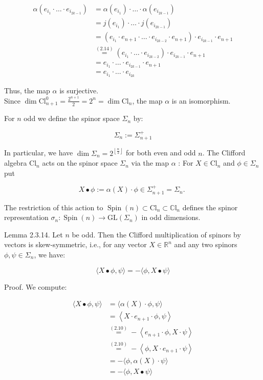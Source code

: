 \documentclass[10pt, letterpaper]{article}
\begin{document}
$$
\begin{aligned}
\alpha\left(e_{i_{1}} \cdot \ldots \cdot e_{i_{2 k-1}}\right) & =\alpha\left(e_{i_{1}}\right) \cdot \ldots \cdot \alpha\left(e_{i_{2 k-1}}\right) \\
& =j\left(e_{i_{1}}\right) \cdot \ldots \cdot j\left(e_{i_{2 k-1}}\right) \\
& =\left(e_{i_{1}} \cdot e_{n+1} \cdot \ldots \cdot e_{i_{2 k-2}} \cdot e_{n+1}\right) \cdot e_{i_{2 k-1}} \cdot e_{n+1} \\
& \stackrel{(2.14)}{=}\left(e_{i_{1}} \cdot \ldots \cdot e_{i_{2 k-2}}\right) \cdot e_{i_{2 k-1}} \cdot e_{n+1} \\
& =e_{i_{1}} \cdot \ldots \cdot e_{i_{2 k-1}} \cdot e_{n+1} \\
& =e_{i_{1}} \cdot \ldots \cdot e_{i_{2 k}}
\end{aligned}
$$

Thus, the map $\alpha$ is surjective.\\
Since $\operatorname{dim} \mathrm{Cl}_{n+1}^{0}=\frac{2^{n+1}}{2}=2^{n}=\operatorname{dim} \mathrm{Cl}_{n}$, the map $\alpha$ is an isomorphism.

For $n$ odd we define the spinor space $\Sigma_{n}$ by:

$$
\Sigma_{n}:=\Sigma_{n+1}^{+}
$$

In particular, we have $\operatorname{dim} \Sigma_{n}=2^{\left\lfloor\frac{n}{2}\right\rfloor}$ for both even and odd $n$. The Clifford algebra $\mathrm{Cl}_{n}$ acts on the spinor space $\Sigma_{n}$ via the map $\alpha$ : For $X \in \mathrm{Cl}_{n}$ and $\phi \in \Sigma_{n}$ put

$$
X \bullet \phi:=\alpha(X) \cdot \phi \in \Sigma_{n+1}^{+}=\Sigma_{n} \text {. }
$$

The restriction of this action to $\operatorname{Spin}(n) \subset \mathrm{Cl}_{n} \subset \mathbb{C l}_{n}$ defines the spinor representation $\sigma_{n}: \operatorname{Spin}(n) \rightarrow \mathrm{GL}\left(\Sigma_{n}\right)$ in odd dimensions.

Lemma 2.3.14. Let $n$ be odd. Then the Clifford multiplication of spinors by vectors is skew-symmetric, i.e., for any vector $X \in \mathbb{R}^{n}$ and any two spinors $\phi, \psi \in \Sigma_{n}$, we have:

$$
\langle X \bullet \phi, \psi\rangle=-\langle\phi, X \bullet \psi\rangle
$$

Proof. We compute:

$$
\begin{aligned}
\langle X \bullet \phi, \psi\rangle & =\langle\alpha(X) \cdot \phi, \psi\rangle \\
& =\left\langle X \cdot e_{n+1} \cdot \phi, \psi\right\rangle \\
& \stackrel{(2.10)}{=}-\left\langle e_{n+1} \cdot \phi, X \cdot \psi\right\rangle \\
& \stackrel{(2.10)}{=}-\left\langle\phi, X \cdot e_{n+1} \cdot \psi\right\rangle \\
& =-\langle\phi, \alpha(X) \cdot \psi\rangle \\
& =-\langle\phi, X \bullet \psi\rangle
\end{aligned}
$$
\end{document}
